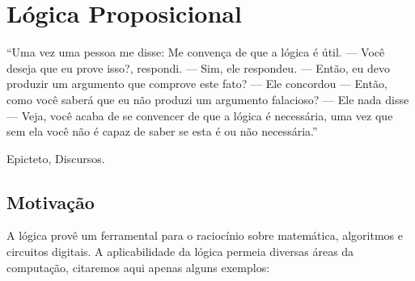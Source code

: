\chapter{L\'ogica Proposicional}\label{cap2}

\epigraph{``Uma vez uma pessoa me disse: Me convença de que a lógica é
útil. --- Você deseja que eu prove isso?, respondi. --- Sim, ele
respondeu. --- Então, eu devo produzir um argumento que comprove este
fato? --- Ele concordou --- Então, como você saberá que eu não produzi
um argumento falacioso? --- Ele nada disse --- Veja, você acaba de se
convencer de que a lógica é necessária, uma vez que sem ela você não é
capaz de saber se esta é ou não necessária.''}{Epicteto, Discursos.}

\section{Motiva\c{c}\~ao}

A l\'ogica prov\^e um ferramental para o racioc\'inio sobre matem\'atica, algoritmos
e circuitos digitais. A aplicabilidade da l\'ogica permeia diversas \'areas da computa\c{c}\~ao,
citaremos aqui apenas alguns exemplos:

